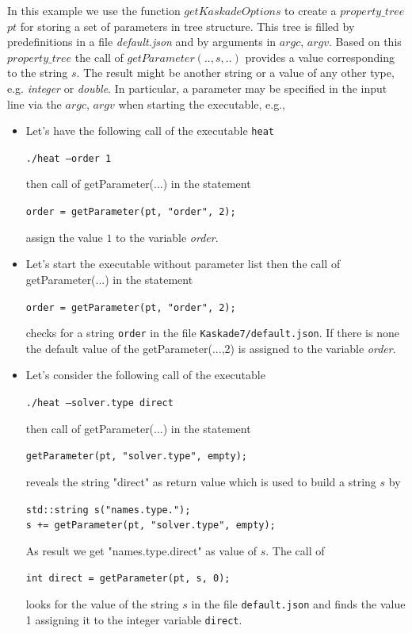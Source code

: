 \documentclass[11pt]{article}
\begin{document}
\noindent In this example we use the function  $getKaskadeOptions$ to create 
a $property\_tree$ $pt$ for storing a set of parameters in tree structure. This tree is filled by predefinitions in 
a  file {\em default.json} and
 by  arguments in $argc$, $argv$. Based on this $property\_tree$
the call of $getParameter(..,s,..)$  
provides a value corresponding to the string $s$.
The result might be another string or a value of any other type, e.g. {\em integer} or {\em double}.
In particular, a parameter may be specified in the input line via the $argc$, $argv$ 
when starting the executable, e.g.,
\begin{itemize}
\item Let's have the following call of the executable {\tt heat}

{\tt  ./heat --order 1 }

then call of getParameter(...) in the statement

{\tt  order =  getParameter(pt, "order", 2);}

assign the value $1$ to the variable {\em order}. 

\item Let's start the executable without parameter list
then the call of getParameter(...) in the statement

{\tt  order =  getParameter(pt, "order", 2);}

checks for a string {\tt order} in the file {\tt Kaskade7/default.json}.
If there is none the default value of the getParameter(...,2) is assigned
to the variable {\em order}.

\item Let's  consider the following call of the executable

{\tt  ./heat --solver.type direct }

then call of getParameter(...) in the statement

{\tt getParameter(pt, "solver.type", empty);}

reveals the string "direct" as return value which is used to build a
 string $s$ by
 
{\tt std::string s("names.type.");}\\
{\tt s += getParameter(pt, "solver.type", empty);}

As result we get  "names.type.direct" as value of $s$. The call of 

{\tt int direct = getParameter(pt, s, 0);}

looks for the value of the string $s$ in the file {\tt default.json} and finds
the value 1 assigning it to the integer variable {\tt direct}.


\end{itemize}
\end{document}
